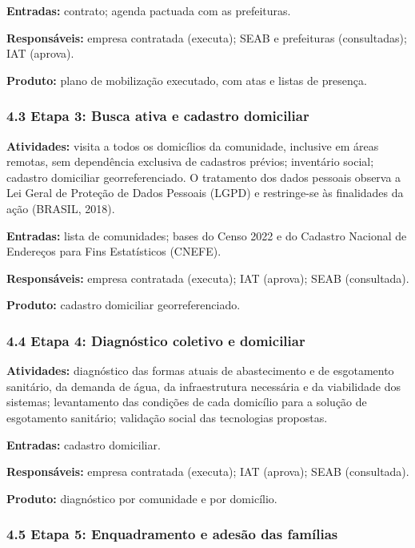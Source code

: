 \textbf{Entradas:} contrato; agenda pactuada com as prefeituras.

\textbf{Responsáveis:} empresa contratada (executa); SEAB e prefeituras (consultadas); IAT (aprova).

\textbf{Produto:} plano de mobilização executado, com atas e listas de presença.

\subsubsection*{4.3 Etapa 3: Busca ativa e cadastro domiciliar}

\textbf{Atividades:} visita a todos os domicílios da comunidade, inclusive em áreas remotas, sem dependência exclusiva de cadastros prévios; inventário social; cadastro domiciliar georreferenciado. O tratamento dos dados pessoais observa a Lei Geral de Proteção de Dados Pessoais (LGPD) e restringe-se às finalidades da ação (BRASIL, 2018).

\textbf{Entradas:} lista de comunidades; bases do Censo 2022 e do Cadastro Nacional de Endereços para Fins Estatísticos (CNEFE).

\textbf{Responsáveis:} empresa contratada (executa); IAT (aprova); SEAB (consultada).

\textbf{Produto:} cadastro domiciliar georreferenciado.

\subsubsection*{4.4 Etapa 4: Diagnóstico coletivo e domiciliar}

\textbf{Atividades:} diagnóstico das formas atuais de abastecimento e de esgotamento sanitário, da demanda de água, da infraestrutura necessária e da viabilidade dos sistemas; levantamento das condições de cada domicílio para a solução de esgotamento sanitário; validação social das tecnologias propostas.

\textbf{Entradas:} cadastro domiciliar.

\textbf{Responsáveis:} empresa contratada (executa); IAT (aprova); SEAB (consultada).

\textbf{Produto:} diagnóstico por comunidade e por domicílio.

\subsubsection*{4.5 Etapa 5: Enquadramento e adesão das famílias}


